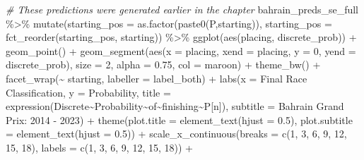 \documentclass[
]{book}
\newenvironment{Shaded}{\begin{snugshade}}{\end{snugshade}}
\newcommand{\AttributeTok}[1]{\textcolor[rgb]{0.77,0.63,0.00}{#1}}
\newcommand{\CommentTok}[1]{\textcolor[rgb]{0.56,0.35,0.01}{\textit{#1}}}
\newcommand{\DecValTok}[1]{\textcolor[rgb]{0.00,0.00,0.81}{#1}}
\newcommand{\FloatTok}[1]{\textcolor[rgb]{0.00,0.00,0.81}{#1}}
\newcommand{\FunctionTok}[1]{\textcolor[rgb]{0.00,0.00,0.00}{#1}}
\newcommand{\NormalTok}[1]{#1}
\newcommand{\SpecialCharTok}[1]{\textcolor[rgb]{0.00,0.00,0.00}{#1}}
\newcommand{\StringTok}[1]{\textcolor[rgb]{0.31,0.60,0.02}{#1}}
\begin{document}
\begin{Shaded}
\begin{Highlighting}[]
\CommentTok{\# These predictions were generated earlier in the chapter}
\NormalTok{bahrain\_preds\_se\_full }\SpecialCharTok{\%\textgreater{}\%}
  \FunctionTok{mutate}\NormalTok{(}\AttributeTok{starting\_pos =} \FunctionTok{as.factor}\NormalTok{(}\FunctionTok{paste0}\NormalTok{(}\StringTok{\textquotesingle{}P\textquotesingle{}}\NormalTok{,starting)),}
         \AttributeTok{starting\_pos =} \FunctionTok{fct\_reorder}\NormalTok{(starting\_pos, starting)) }\SpecialCharTok{\%\textgreater{}\%}
  \FunctionTok{ggplot}\NormalTok{(}\FunctionTok{aes}\NormalTok{(placing, discrete\_prob)) }\SpecialCharTok{+}
  \FunctionTok{geom\_point}\NormalTok{() }\SpecialCharTok{+}
  \FunctionTok{geom\_segment}\NormalTok{(}\FunctionTok{aes}\NormalTok{(}\AttributeTok{x =}\NormalTok{ placing, }\AttributeTok{xend =}\NormalTok{ placing, }\AttributeTok{y =} \DecValTok{0}\NormalTok{, }\AttributeTok{yend =}\NormalTok{ discrete\_prob),}
               \AttributeTok{size =} \DecValTok{2}\NormalTok{, }\AttributeTok{alpha =} \FloatTok{0.75}\NormalTok{, }\AttributeTok{col =} \StringTok{\textquotesingle{}maroon\textquotesingle{}}\NormalTok{) }\SpecialCharTok{+}
  \FunctionTok{theme\_bw}\NormalTok{() }\SpecialCharTok{+}
  \FunctionTok{facet\_wrap}\NormalTok{(}\SpecialCharTok{\textasciitilde{}}\NormalTok{ starting, }\AttributeTok{labeller =}\NormalTok{ label\_both) }\SpecialCharTok{+}
  \FunctionTok{labs}\NormalTok{(}\AttributeTok{x =} \StringTok{\textquotesingle{}Final Race Classification\textquotesingle{}}\NormalTok{,}
       \AttributeTok{y =} \StringTok{\textquotesingle{}Probability\textquotesingle{}}\NormalTok{,}
       \AttributeTok{title =} \FunctionTok{expression}\NormalTok{(Discrete}\SpecialCharTok{\textasciitilde{}}\NormalTok{Probability}\SpecialCharTok{\textasciitilde{}}\NormalTok{of}\SpecialCharTok{\textasciitilde{}}\NormalTok{finishing}\SpecialCharTok{\textasciitilde{}}\NormalTok{P[n]),}
       \AttributeTok{subtitle =} \StringTok{\textquotesingle{}Bahrain Grand Prix: 2014 {-} 2023\textquotesingle{}}\NormalTok{) }\SpecialCharTok{+}
  \FunctionTok{theme}\NormalTok{(}\AttributeTok{plot.title =} \FunctionTok{element\_text}\NormalTok{(}\AttributeTok{hjust =} \FloatTok{0.5}\NormalTok{),}
        \AttributeTok{plot.subtitle =} \FunctionTok{element\_text}\NormalTok{(}\AttributeTok{hjust =} \FloatTok{0.5}\NormalTok{)) }\SpecialCharTok{+}
  \FunctionTok{scale\_x\_continuous}\NormalTok{(}\AttributeTok{breaks =} \FunctionTok{c}\NormalTok{(}\DecValTok{1}\NormalTok{, }\DecValTok{3}\NormalTok{, }\DecValTok{6}\NormalTok{, }\DecValTok{9}\NormalTok{, }\DecValTok{12}\NormalTok{, }\DecValTok{15}\NormalTok{, }\DecValTok{18}\NormalTok{), }\AttributeTok{labels =} \FunctionTok{c}\NormalTok{(}\DecValTok{1}\NormalTok{, }\DecValTok{3}\NormalTok{, }\DecValTok{6}\NormalTok{, }\DecValTok{9}\NormalTok{, }\DecValTok{12}\NormalTok{, }\DecValTok{15}\NormalTok{, }\DecValTok{18}\NormalTok{)) }\SpecialCharTok{+}

\end{Highlighting}
\end{Shaded}
\end{document}
